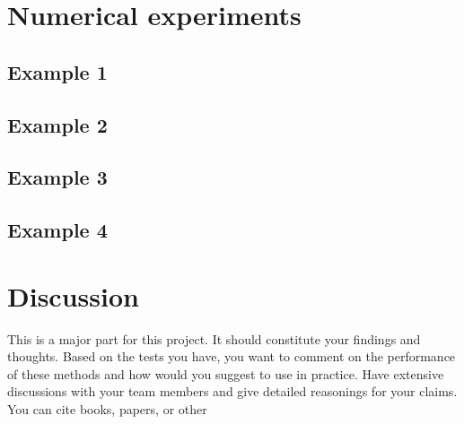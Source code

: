 \documentclass[11pt]{article}	%
\begin{document}
\section{Numerical experiments}
\subsection{Example 1}

\subsection{Example 2}

\subsection{Example 3}

\subsection{Example 4}

\section{Discussion}
This is a major part for this project. It should constitute your findings and thoughts.
Based on the tests you have,
you want to comment on the performance of these methods and how would you
suggest to use in practice. Have extensive discussions with your team members
and give detailed reasonings for your claims. You can cite books, papers, or other
\end{document}
